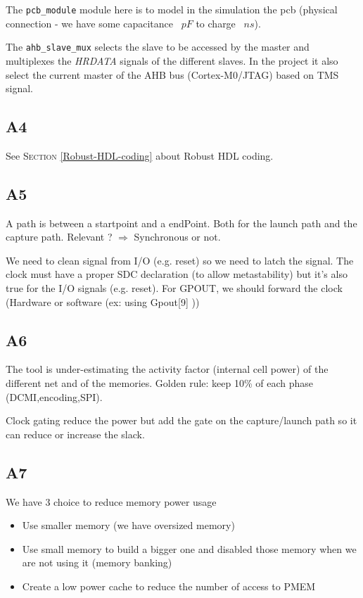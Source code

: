 The \texttt{pcb\_module}  module here is to model in the simulation the pcb (physical connection - we have some capacitance ~\(pF\) to charge ~\(ns\)).

The \texttt{ahb\_slave\_mux} selects the slave to be accessed by the master and multiplexes the \textit{HRDATA} signals of the different slaves. In the project it also select the current master of the AHB bus (Cortex-M0/JTAG) based on TMS signal.


\subsection{A4}
See \textsc{Section} \ref{Robust-HDL-coding}  about Robust HDL coding.


\subsection{A5}
A path is between a startpoint and a endPoint. Both for the launch path and the capture path. Relevant ? \(\Rightarrow\) Synchronous or not.

We need to clean signal from I/O (e.g. reset) so we need to latch the signal. The clock must have a proper SDC declaration (to allow metastability) but it's also true for the I/O signals (e.g. reset). For GPOUT, we should forward the clock (Hardware or software (ex: using Gpout[9] ))


\subsection{A6}

The tool is under-estimating the activity factor (internal cell power) of the different net and of the memories. Golden rule: keep 10\% of each phase (DCMI,encoding,SPI). 

Clock gating reduce the power but add the gate on the capture/launch path so it can reduce  or increase the slack.

\subsection{A7}
We have 3 choice to reduce memory power usage
\begin{itemize}
  \item Use smaller memory (we have oversized memory)
  \item Use small memory to build a bigger one and disabled those memory when we are not using it (memory banking)
  \item Create a low power cache to reduce the number of access to PMEM
\end{itemize}

